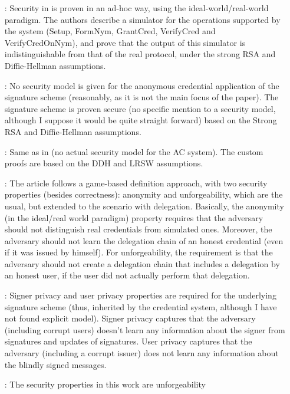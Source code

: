 \begin{enumerate}
\item[\cite{cl01}:] Security in \cite{cl01} is proven in an ad-hoc way,
  using the ideal-world/real-world paradigm. The authors describe a
  simulator for the operations supported by the system (Setup, FormNym,
  GrantCred, VerifyCred and VerifyCredOnNym), and prove that the output of this
  simulator is indistinguishable from that of the real protocol, under the
  strong RSA and Diffie-Hellman assumptions.  
\item[\cite{cl02}:] No security model is given for the anonymous credential
  application of the signature scheme (reasonably, as it is not the main focus
  of the paper). The signature scheme is proven secure (no specific mention
  to a security model, although I suppose it would be quite straight forward)
  based on the Strong RSA and Diffie-Hellman assumptions.
\item[\cite{cl04}:] Same as in \cite{cl02} (no actual security model for the
  AC system). The custom proofs are based on the DDH and LRSW assumptions.
\item[\cite{bcc+09}:] The article follows a game-based definition approach,
  with two security properties (besides correctness): anonymity and
  unforgeability, which are the usual, but extended to the scenario with
  delegation. Basically, the anonymity (in the ideal/real world paradigm)
  property requires that the adversary should not distinguish real credentials
  from simulated ones. Moreover, the adversary should not learn the delegation
  chain of an honest credential (even if it was issued by himself). For
  unforgeability, the requirement is that the adversary should not create
  a delegation chain that includes a delegation by an honest user, if the
  user did not actually perform that delegation.
\item[\cite{cks10}:] Signer privacy and user privacy properties are required
  for the underlying signature scheme (thus, inherited by the credential system,
  although I have not found explicit model). Signer privacy captures that the
  adversary (including corrupt users) doesn't learn any information about the
  signer from signatures and updates of signatures. User privacy captures that
  the adversary (including a corrupt issuer) does not learn any information
  about the blindly signed messages. 
\item[\cite{cl11}:] The security properties in this work are unforgeability

\end{enumerate}

